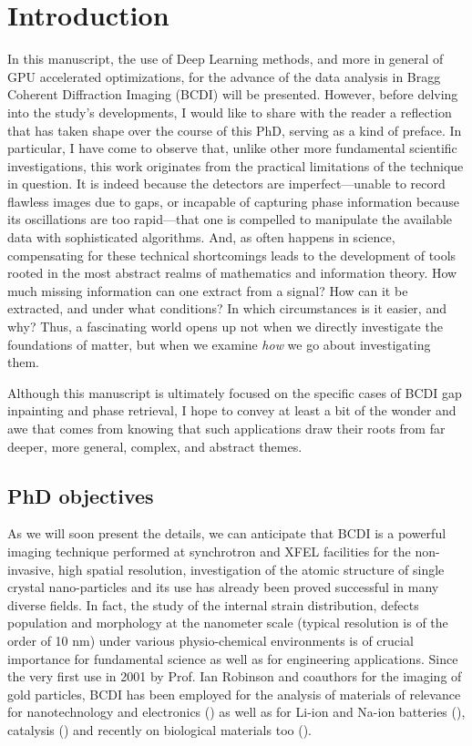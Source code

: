 \section{Introduction}\label{chp:intro}

In this manuscript, the use of Deep Learning methods, and more in general of GPU accelerated optimizations, for the advance of 
the data analysis in Bragg Coherent Diffraction Imaging (BCDI) will be presented. However, before delving into the 
study’s developments, I would like to share with the reader a reflection that has taken shape over the course of this 
PhD, serving as a kind of preface. In particular, I have come to observe that, unlike other more fundamental 
scientific investigations, this work originates from the practical limitations of the technique in question. 
It is indeed because the detectors are imperfect—unable to record flawless images due to gaps, or incapable of 
capturing phase information because its oscillations are too rapid—that one is compelled to manipulate the available 
data with sophisticated algorithms. And, as often happens in science, compensating for these technical shortcomings 
leads to the development of tools rooted in the most abstract realms of mathematics and information theory. How much 
missing information can one extract from a signal? How can it be extracted, and under what conditions? In which 
circumstances is it easier, and why? Thus, a fascinating world opens up not when we directly investigate the foundations 
of matter, but when we examine \textit{how} we go about investigating them.

Although this manuscript is ultimately focused on the specific cases of BCDI gap inpainting and phase retrieval, 
I hope to convey at least a bit of the wonder and awe that comes from knowing that such applications draw their roots 
from far deeper, more general, complex, and abstract themes.

\subsection{PhD objectives}

As we will soon present the details, we can anticipate that BCDI is a powerful imaging technique performed at synchrotron 
and XFEL facilities for the non-invasive, high spatial resolution, investigation of the atomic structure of single crystal nano-particles and its use has already been
proved successful in many diverse fields. In fact, the study of the internal strain distribution, defects population and 
morphology at the nanometer scale (typical resolution is of the order of 10 nm) under various physio-chemical environments 
is of crucial importance for fundamental science as well as for engineering applications. Since the very first use in 2001 
by Prof. Ian Robinson and coauthors \cite{Robinson_gold_2001} for the imaging of gold particles, BCDI has been employed for the 
analysis of materials of relevance for nanotechnology and electronics () as well as for Li-ion and Na-ion batteries (), 
catalysis () and recently on biological materials too (). 

